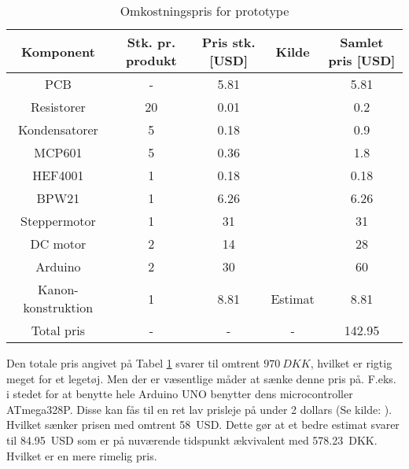 \begin{table}[H] 
	\caption{Omkostningspris for prototype} %
	\label{tab:omkostning}
	\centering
		\begin{tabular}{c|c c c c} 
		
		Komponent & Stk. pr. produkt & Pris stk. [USD] & Kilde & Samlet pris [USD]\\ [0.5ex] 
		\hline 
			PCB & - & 5.81 & \cite{price:PCB} & 5.81\\ 
			Resistorer & 20 & 0.01& \cite{price:resistor} & 0.2\\
			Kondensatorer & 5 &  0.18 & \cite{price:capacitor} & 0.9\\
			MCP601 & 5 & 0.36& \cite{price:MCP601} & 1.8\\
			HEF4001 & 1 &0.18& \cite{price:HEF4001} & 0.18\\
			BPW21 & 1 &6.26& \cite{price:BPW21} & 6.26 \\
			Steppermotor &1 & 31 & \cite{price:stepper}&31 \\
			DC motor & 2 & 14 & \cite{price:dcmotor} &28 \\ 
			Arduino & 2 & 30 &\cite{price:arduino} & 60 \\
			Kanon-konstruktion & 1 & 8.81 & Estimat & 8.81 \\
			Total pris & - &- & - & 142.95\\[1ex]
		\hline %
	\end{tabular}
\end{table}
Den totale pris angivet på Tabel \ref{tab:omkostning} svarer til omtrent $\SI{970}{DKK}$, hvilket er rigtig meget for et legetøj. Men der er væsentlige måder at sænke denne pris på. F.eks. i stedet for at benytte hele Arduino UNO benytter dens microcontroller ATmega328P. Disse kan fås til en ret lav prisleje på under 2 dollars (Se kilde: \cite{price:atmega}). Hvilket sænker prisen med omtrent \SI{58}{USD}. Dette gør at et bedre estimat svarer til \SI{84.95}{USD} som er på nuværende tidspunkt ækvivalent med \SI{578.23}{DKK}. Hvilket er en mere rimelig pris.



